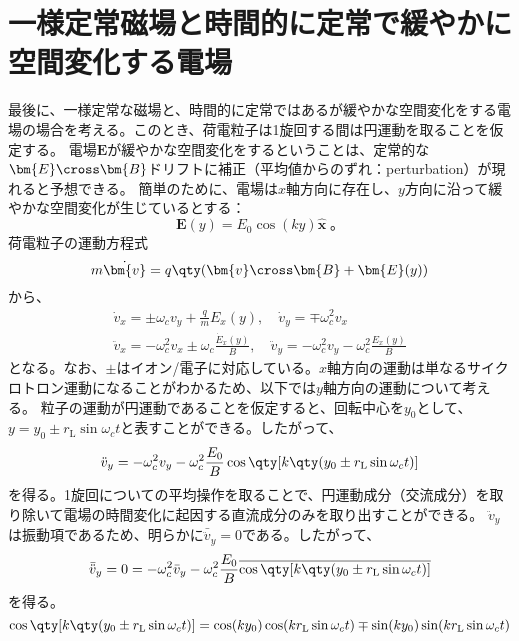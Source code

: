 \newpage
\section{一様定常磁場と時間的に定常で緩やかに空間変化する電場}
最後に、一様定常な磁場と、時間的に定常ではあるが緩やかな空間変化をする電場の場合を考える。このとき、荷電粒子は1旋回する間は円運動を取ることを仮定する。
電場$\bm{E}$が緩やかな空間変化をするということは、定常的な$\bm{E}\cross\bm{B}$ドリフトに補正（平均値からのずれ：perturbation）が現れると予想できる。
簡単のために、電場は$x$軸方向に存在し、$y$方向に沿って緩やかな空間変化が生じているとする：
\begin{equation}
	\bm{E}(y) = E_0\cos(ky)\hat{\bm{x}}\;。
\end{equation}
荷電粒子の運動方程式
\begin{equation}
	m\dot{\bm{v}} = q\qty(\bm{v}\cross\bm{B} + \bm{E}(y))
\end{equation}
から、
\begin{equation}
	\begin{gathered}
		\dot{v}_x = \pm\omega_cv_y + \frac{q}{m}E_x(y),\quad \dot{v}_y = \mp\omega_c^2v_x \\
		\ddot{v}_x = -\omega_c^2v_x \pm\omega_c\frac{\dot{E}_x(y)}{B},\quad\ddot{v}_y = -\omega^2_cv_y -\omega_c^2\frac{E_x(y)}{B}
	\end{gathered}
\end{equation}
となる。なお、$\pm$はイオン/電子に対応している。$x$軸方向の運動は単なるサイクロトロン運動になることがわかるため、以下では$y$軸方向の運動について考える。
粒子の運動が円運動であることを仮定すると、回転中心を$y_0$として、$y = y_0 \pm r_{\text{L}}\sin{\omega_ct}$と表すことができる。したがって、
\begin{equation}
	\ddot{v}_y = -\omega_c^2v_y - \omega_c^2\frac{E_0}{B}\cos\qty[k\qty(y_0\pm r_{\text{L}}\sin{\omega_ct})]
\end{equation}
を得る。1旋回についての平均操作を取ることで、円運動成分（交流成分）を取り除いて電場の時間変化に起因する直流成分のみを取り出すことができる。
$\ddot{v}_y$は振動項であるため、明らかに$\bar{\ddot{v}}_y = 0$である。したがって、
\begin{equation}
	\bar{\ddot{v}}_y = 0 = -\omega_c^2\bar{v}_y - \omega_c^2\frac{E_0}{B}\overline{\cos\qty[k\qty(y_0\pm r_{\text{L}}\sin{\omega_ct})]}
\end{equation}
を得る。
\begin{equation}
	\cos\qty[k\qty(y_0\pm r_{\text{L}}\sin{\omega_ct})]
	= \cos(ky_0)\cos(kr_{\text{L}}\sin{\omega_ct}) \mp \sin(ky_0)\sin(kr_{\text{L}}\sin\omega_ct)
\end{equation}
